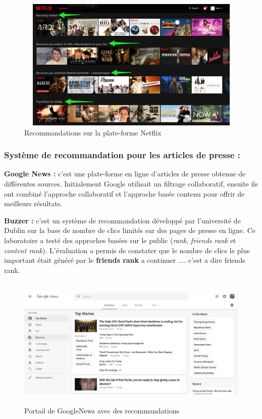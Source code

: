             \begin{figure}[H]
                \centering
                   \includegraphics[height=180pt,width=350pt]{img/chapter1/netflix.jpg}
                \caption{Recommandations sur la plate-forme Netflix}
            \end{figure}

        \subsubsection*{Système de recommandation pour les articles de presse :} 
        \textbf{Google News :} c'est une plate-forme en ligne d'articles de presse obtenue de différentes sources. Initialement Google utilisait un filtrage collaboratif, ensuite ils ont combiné l'approche collaboratif et l'approche basée contenu pour offrir de meilleurs résultats.\cite{gglnews}

        \textbf{Buzzer :} c'est un système de recommandation développé par l'université de Dublin sur la base de nombre de clics limités sur des pages de presse en ligne. Ce laboratoire a testé des approches basées sur le public (\emph{rank}, \emph{friends rank} et \emph{content rank}). L'évaluation a permis de constater que le nombre de clics le plus important était généré par le \textbf{friends rank} a continuer .... c'est a dire friends rank.\cite{gglnews}\\
            \begin{figure}[H]
                \centering
                   \includegraphics[height=180pt,width=350pt]{img/chapter1/news.jpg}
                \caption{Portail de GoogleNews avec des recommandations}
            \end{figure}

